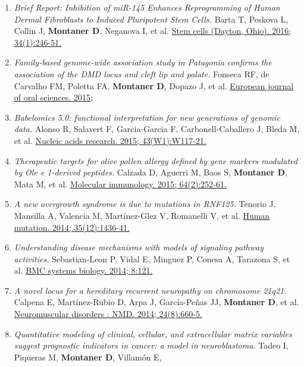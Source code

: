 \begin{enumerate}
\def\labelenumi{\arabic{enumi}.}
\tightlist
\item
  \emph{Brief Report: Inhibition of miR-145 Enhances Reprogramming of
  Human Dermal Fibroblasts to Induced Pluripotent Stem Cells.} Barta T,
  Peskova L, Collin J, \textbf{Montaner D}, Neganova I, et al.
  \href{http://www.ncbi.nlm.nih.gov//pubmed/26418476}{Stem cells
  (Dayton, Ohio). 2016; 34(1):246-51.}
\item
  \emph{Family-based genome-wide association study in Patagonia confirms
  the association of the DMD locus and cleft lip and palate.} Fonseca
  RF, de Carvalho FM, Poletta FA, \textbf{Montaner D}, Dopazo J, et al.
  \href{http://www.ncbi.nlm.nih.gov//pubmed/26331285}{European journal
  of oral sciences. 2015;}
\item
  \emph{Babelomics 5.0: functional interpretation for new generations of
  genomic data.} Alonso R, Salavert F, Garcia-Garcia F,
  Carbonell-Caballero J, Bleda M, et al.
  \href{http://www.ncbi.nlm.nih.gov//pubmed/25897133}{Nucleic acids
  research. 2015; 43(W1):W117-21.}
\item
  \emph{Therapeutic targets for olive pollen allergy defined by gene
  markers modulated by Ole e 1-derived peptides.} Calzada D, Aguerri M,
  Baos S, \textbf{Montaner D}, Mata M, et al.
  \href{http://www.ncbi.nlm.nih.gov//pubmed/25553522}{Molecular
  immunology. 2015; 64(2):252-61.}
\item
  \emph{A new overgrowth syndrome is due to mutations in RNF125.}
  Tenorio J, Mansilla A, Valencia M, Martínez-Glez V, Romanelli V, et
  al. \href{http://www.ncbi.nlm.nih.gov//pubmed/25196541}{Human
  mutation. 2014; 35(12):1436-41.}
\item
  \emph{Understanding disease mechanisms with models of signaling
  pathway activities.} Sebastian-Leon P, Vidal E, Minguez P, Conesa A,
  Tarazona S, et al.
  \href{http://www.ncbi.nlm.nih.gov//pubmed/25344409}{BMC systems
  biology. 2014; 8:121.}
\item
  \emph{A novel locus for a hereditary recurrent neuropathy on
  chromosome 21q21.} Calpena E, Martínez-Rubio D, Arpa J, García-Peñas
  JJ, \textbf{Montaner D}, et al.
  \href{http://www.ncbi.nlm.nih.gov//pubmed/24878226}{Neuromuscular
  disorders : NMD. 2014; 24(8):660-5.}
\item
  \emph{Quantitative modeling of clinical, cellular, and extracellular
  matrix variables suggest prognostic indicators in cancer: a model in
  neuroblastoma.} Tadeo I, Piqueras M, \textbf{Montaner D}, Villamón E,

\end{enumerate}
